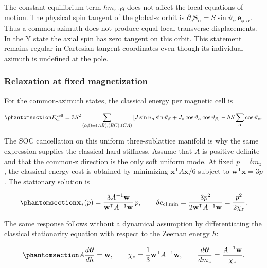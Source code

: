 The constant equilibrium term \(\hbar m_{z,0}\dot q\) does not affect
the local equations of motion. The physical spin tangent of the global-z
orbit is
\(\partial_q\mathbf S_\alpha=S\sin\vartheta_\alpha\,\mathbf e_{\phi,\alpha}\).
Thus a common azimuth does not produce equal local transverse
displacements. In the Y state the axial spin has zero tangent on this
orbit. This statement remains regular in Cartesian tangent coordinates
even though its individual azimuth is undefined at the pole.

\subsubsection{Relaxation at fixed
magnetization}\label{relaxation-at-fixed-magnetization}

For the common-azimuth states, the classical energy per magnetic cell is

\begin{equation}\phantomsection\label{eq-lswt-yv-pg-classical-energy}{
E_{\rm cl}^{\rm cell}
=3S^2\sum_{(\alpha\beta)=(AB),(BC),(CA)}
\left[J\sin\vartheta_\alpha\sin\vartheta_\beta
+J_z\cos\vartheta_\alpha\cos\vartheta_\beta\right]
-hS\sum_\alpha\cos\vartheta_\alpha.
}\end{equation}

The SOC cancellation on this uniform three-sublattice manifold is why
the same expression supplies the classical hard stiffness. Assume that
\(A\) is positive definite and that the common-z direction is the only
soft uniform mode. At fixed \(p=\delta m_z\), the classical energy cost
is obtained by minimizing \(\mathbf x^{\mathsf T}A\mathbf x/6\) subject
to \(\mathbf w^{\mathsf T}\mathbf x=3p\). The stationary solution is

\begin{equation}\phantomsection\label{eq-lswt-yv-pg-fixed-magnetization}{
\mathbf x_*(p)
=\frac{3A^{-1}\mathbf w}{\mathbf w^{\mathsf T}A^{-1}\mathbf w}\,p,
\qquad
\delta e_{\rm cl,min}=
\frac{3p^2}{2\mathbf w^{\mathsf T}A^{-1}\mathbf w}
=\frac{p^2}{2\chi_z}.
}\end{equation}

The same response follows without a dynamical assumption by
differentiating the classical stationarity equation with respect to the
Zeeman energy \(h\):

\begin{equation}\phantomsection\label{eq-lswt-yv-pg-susceptibility}{
A\frac{d\boldsymbol\vartheta}{dh}=\mathbf w,
\qquad
\chi_z=\frac{1}{3}\mathbf w^{\mathsf T}A^{-1}\mathbf w,
\qquad
\frac{d\boldsymbol\vartheta}{dm_z}=\frac{A^{-1}\mathbf w}{\chi_z}.
}\end{equation}

